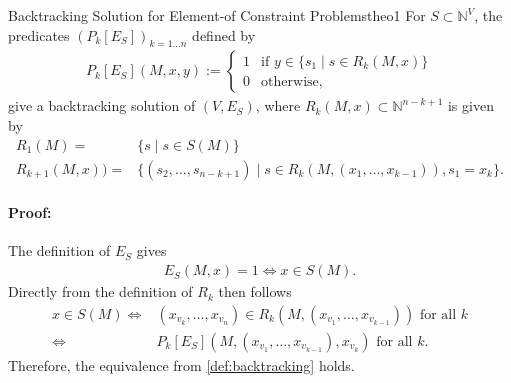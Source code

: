 \begin{theorem}{Backtracking Solution for Element-of Constraint Problems}{theo1}
    For $S\subset\mathbb N^V$, the predicates $(P_k[E_S])_{k=1\dots n}$
    defined by
    \begin{align*}
        P_k[E_S](M,x,y):=\left\{
            \begin{array}{ll}
                1&\text{if }y\in \{s_1\mid s\in R_k(M,x)\}\\
                0&\text{otherwise},
            \end{array}\right.
    \end{align*}
    give a backtracking solution of $(V,E_S)$, where
    $R_k(M,x)\subset\mathbb N^{n-k+1}$ is given by
    \begin{align*}
        R_1(M)={}&\{s\mid s\in S(M)\}\\
        R_{k+1}(M,x))={}&\{(s_2,\dots,s_{n-k+1})\mid s\in R_k(M,(x_1,\dots,x_{k-1})), s_1=x_k\}.
    \end{align*}
    \tcblower
    \paragraph*{Proof:} The definition of $E_S$ gives 
    \begin{align*}
        E_S(M,x)=1\iff x\in S(M).
    \end{align*}
    Directly from the definition of $R_k$ then follows
    \begin{align*}
        x\in S(M)\iff{}&(x_{v_k},\dots,x_{v_n})\in R_k(M,(x_{v_1},\dots,x_{v_{k-1}}))\text{ for all }k\\
                 \iff{}&P_k[E_S](M,(x_{v_1},\dots,x_{v_{k-1}}),x_{v_k})\text{ for all }k.
    \end{align*}
    Therefore, the equivalence from \autoref{def:backtracking} holds.
\end{theorem}

